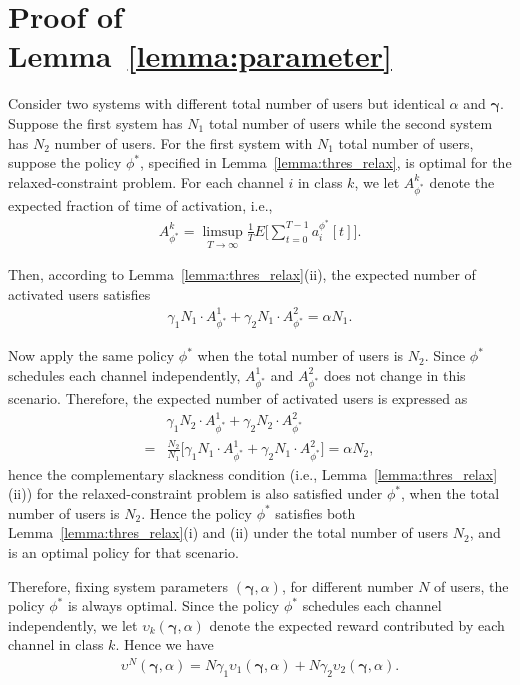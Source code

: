 \documentclass[11pt,twocolumn]{IEEEtran}
\begin{document}
\section{Proof of Lemma~\ref{lemma:parameter}}
\label{appen:peruser}

Consider two systems with different total number of users but identical $\alpha$ and $\bm \gamma$. Suppose the first system has $N_1$ total number of users while the second system has $N_2$ number of users. For the first system with $N_1$ total number of users, suppose the policy $\phi^*$, specified in Lemma~\ref{lemma:thres_relax}, is optimal for the relaxed-constraint problem. For each channel $i$ in class $k$, we let $A^k_{\phi^*}$ denote the expected fraction of time of activation, i.e.,
\begin{align}
\nonumber
A^k_{\phi^*}=\limsup_{T\rightarrow \infty} \frac{1}{T}E\Big[\sum_{t=0}^{T-1} a^{\phi^*}_i[t] \Big].
\end{align}


Then, according to Lemma~\ref{lemma:thres_relax}(ii), the expected number of activated users satisfies
\begin{align}
\nonumber\gamma_1 N_1 \cdot A^1_{\phi^*}+ \gamma_2 N_1 \cdot A^2_{\phi^*}=\alpha N_1.
\end{align}

Now apply the same policy $\phi^*$ when the total number of users is $N_2$. Since $\phi^*$ schedules each channel independently, $A^1_{\phi^*}$ and $A^2_{\phi^*}$ does not change in this scenario. Therefore, the expected number of activated users is expressed as
\begin{align}
&\gamma_1 N_2 \cdot A^1_{\phi^*}+ \gamma_2 N_2 \cdot A^2_{\phi^*}\nonumber\\
=&\frac{N_2}{N_1}\big[\gamma_1 N_1 \cdot A^1_{\phi^*}+ \gamma_2 N_1 \cdot A^2_{\phi^*}\big]=\alpha N_2,\nonumber
\end{align}
hence the complementary slackness condition (i.e., Lemma~\ref{lemma:thres_relax}(ii)) for the relaxed-constraint problem is also satisfied under $\phi^*$, when the total number of users is $N_2$. Hence the policy $\phi^*$ satisfies both Lemma~\ref{lemma:thres_relax}(i) and (ii) under the total number of users $N_2$, and is an optimal policy for that scenario.

Therefore, fixing system parameters $(\bm \gamma, \alpha)$, for different number $N$ of users, the policy $\phi^*$ is always optimal. Since the policy $\phi^*$ schedules each channel independently, we let $\upsilon_k(\bm \gamma, \alpha)$ denote the expected reward contributed by each channel in class $k$. Hence we have
\begin{align}
\nonumber
\upsilon^N(\bm \gamma, \alpha)=N \gamma_1 \upsilon_1(\bm \gamma, \alpha)+N \gamma_2 \upsilon_2(\bm \gamma, \alpha).
\end{align}
\end{document}
